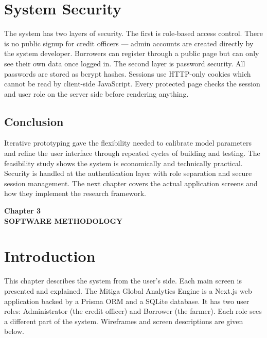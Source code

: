 \documentclass[12pt,a4paper]{article}
\begin{document}
\section{System Security}

The system has two layers of security. The first is role-based access control. There is no public signup for credit officers --- admin accounts are created directly by the system developer. Borrowers can register through a public page but can only see their own data once logged in. The second layer is password security. All passwords are stored as bcrypt hashes. Sessions use HTTP-only cookies which cannot be read by client-side JavaScript. Every protected page checks the session and user role on the server side before rendering anything.

\subsection*{Conclusion}

Iterative prototyping gave the flexibility needed to calibrate model parameters and refine the user interface through repeated cycles of building and testing. The feasibility study shows the system is economically and technically practical. Security is handled at the authentication layer with role separation and secure session management. The next chapter covers the actual application screens and how they implement the research framework.

\newpage

\begin{center}
    {\large\bfseries Chapter 3}\\[0.5cm]
    {\LARGE\bfseries SOFTWARE METHODOLOGY}
\end{center}
{}

\vspace{0.8cm}

\setcounter{section}{0}
\renewcommand{\thesection}{3.\arabic{section}}

\section{Introduction}

This chapter describes the system from the user's side. Each main screen is presented and explained. The Mitiga Global Analytics Engine is a Next.js web application backed by a Prisma ORM and a SQLite database. It has two user roles: Administrator (the credit officer) and Borrower (the farmer). Each role sees a different part of the system. Wireframes and screen descriptions are given below.
\end{document}
